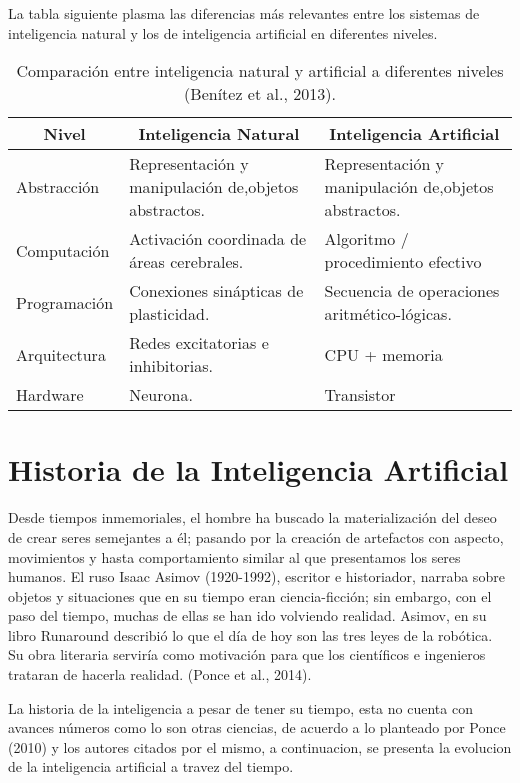 La tabla siguiente plasma las diferencias más relevantes entre los sistemas de inteligencia natural y los de inteligencia artificial en diferentes niveles.

\newpage
\begin{table}[H]
\centering
\caption{Comparación entre inteligencia natural y artificial a diferentes niveles (Benítez et al., 2013).}
\begin{turn}{90}
\label{my-label}
\begin{tabular}{|l|l|l|}
\hline
\multicolumn{1}{|c|}{\textbf{Nivel}} & \multicolumn{1}{c|}{\textbf{Inteligencia Natural}} & \multicolumn{1}{c|}{\textbf{Inteligencia Artificial}} \\ \hline
Abstracción & Representación y manipulación de,objetos abstractos. & Representación y manipulación de,objetos abstractos. \\ \hline
Computación & Activación coordinada de áreas cerebrales. & Algoritmo / procedimiento efectivo \\ \hline
Programación & Conexiones sinápticas de plasticidad. & Secuencia de operaciones aritmético-lógicas. \\ \hline
Arquitectura & Redes excitatorias e inhibitorias. & CPU + memoria \\ \hline
Hardware & Neurona. & Transistor \\ \hline
\end{tabular}
\end{turn}
\end{table}

\section{Historia de la Inteligencia Artificial}

Desde tiempos inmemoriales, el hombre ha buscado la materialización del deseo de crear seres semejantes a él; pasando por la creación de artefactos con aspecto, movimientos y hasta comportamiento similar al que presentamos los seres humanos. El ruso Isaac Asimov (1920-1992), escritor e historiador, narraba sobre objetos y situaciones que en su tiempo eran ciencia-ficción; sin embargo, con el paso del tiempo, muchas de ellas se han ido volviendo realidad. Asimov, en su libro Runaround describió lo que el día de hoy son las tres leyes de la robótica. Su obra literaria serviría como motivación para que los científicos e ingenieros trataran de hacerla realidad. (Ponce et al., 2014).

La historia de la inteligencia a pesar de tener su tiempo, esta no cuenta con avances números como lo son otras ciencias, de acuerdo a lo planteado por Ponce (2010) y los autores citados por el mismo, a continuacion, se presenta la evolucion de la inteligencia artificial a travez del tiempo.

